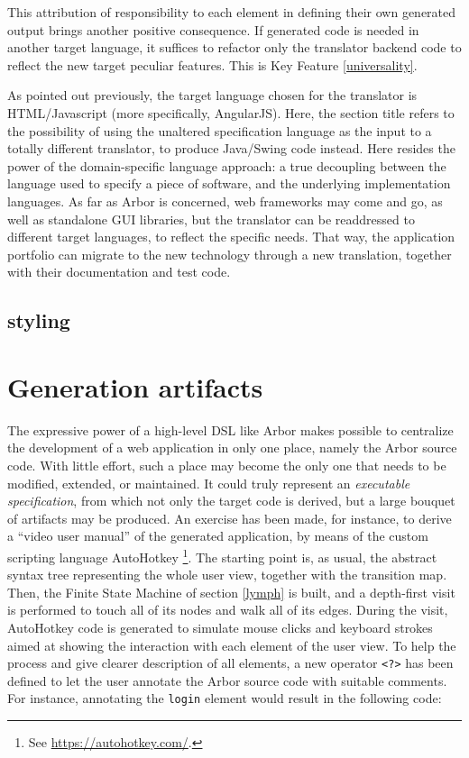 \documentclass[12pt]{article} %
\newcommand{\dsl}{domain-specific language}
\newcommand{\DSL}{DSL}
\newcommand{\abs}{abstract syntax tree}
\newcommand{\A}{Arbor}
\newcommand{\myverb}[1]{\texttt{\footnotesize #1}}
\newcommand{\q}[1]{``#1''}
\newcounter{kfcounter}
\newenvironment{kfe}[2]
	{\refstepcounter{kfcounter}\begin{tcolorbox}[colback=green!35!white,colframe=brown!75!red,title=Key Feature \thekfcounter: \emph{#1}\label{#2}]}
	{\end{tcolorbox}}
\begin{document}
This attribution of responsibility to each element in defining their own generated output brings another positive consequence. If generated code is needed in another target language, it suffices to refactor only the translator backend code to reflect the new target peculiar features. This is Key Feature \ref{universality}.
\begin{kfe}{Universality}{universality}
As pointed out previously, the target language chosen for the translator is HTML/Javascript (more specifically, AngularJS). Here, the section title refers to the possibility of using the unaltered specification language as the input to a totally different translator, to produce Java/Swing code instead. Here resides the power of the \dsl{} approach: a true decoupling between the language used to specify a piece of software, and the underlying implementation languages. As far as \A{} is concerned, web frameworks may come and go, as well as standalone GUI libraries, but the translator can be readdressed to different target languages, to reflect the specific needs. That way, the application portfolio can migrate to the new technology through a new translation, together with their documentation and test code.
\end{kfe}
\subsection{styling}
\section{Generation artifacts}
The expressive power of a high-level \DSL{} like \A{} makes possible to centralize the development of a web application in only one place, namely the \A{} source code. With little effort, such a place may become the only one that needs to be modified, extended, or maintained. It could truly represent an \emph{executable specification}, from which not only the target code is derived, but a large bouquet of artifacts may be produced. An exercise has been made, for instance, to derive a \q{video user manual} of the generated application, by means of the custom scripting language AutoHotkey \footnote{See \url{https://autohotkey.com/}.}. The starting point is, as usual,  the \abs{} representing the whole user view, together with the transition map. Then, the Finite State Machine of section \ref{lymph} is built, and a depth-first visit is performed to touch all of its nodes and walk all of its edges. During the visit, AutoHotkey code is generated to simulate mouse clicks and keyboard strokes aimed at showing the interaction with each element of the user view. To help the process and give clearer description of all elements, a new operator \myverb{<?>} has been defined to let the user annotate the \A{} source code with suitable comments. For instance, annotating the \myverb{login} element would result in the following code:
\end{document}
